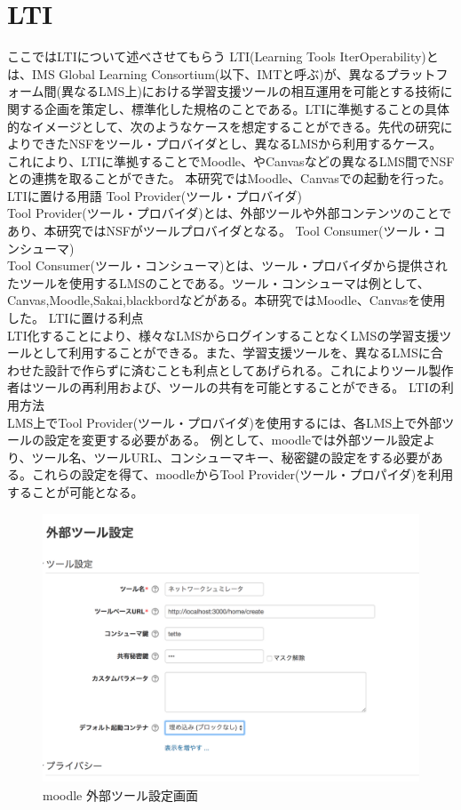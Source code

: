 \section{LTI}
\label{tag:LTI}
ここではLTIについて述べさせてもらう
LTI(Learning Tools IterOperability)とは、IMS Global Learning Consortium(以下、IMTと呼ぶ)が、異なるプラットフォーム間(異なるLMS上)における学習支援ツールの相互運用を可能とする技術に関する企画を策定し、標準化した規格のことである。LTIに準拠することの具体的なイメージとして、次のようなケースを想定することができる。先代の研究によりできたNSFをツール・プロバイダとし、異なるLMSから利用するケース。
これにより、LTIに準拠することでMoodle、やCanvasなどの異なるLMS間でNSFとの連携を取ることができた。
本研究ではMoodle、Canvasでの起動を行った。
LTIに置ける用語
Tool Provider(ツール・プロバイダ)\\
Tool Provider(ツール・プロバイダ)とは、外部ツールや外部コンテンツのことであり、本研究ではNSFがツールプロバイダとなる。
Tool Consumer(ツール・コンシューマ)\\
Tool Consumer(ツール・コンシューマ)とは、ツール・プロバイダから提供されたツールを使用するLMSのことである。ツール・コンシューマは例として、Canvas,Moodle,Sakai,blackbordなどがある。本研究ではMoodle、Canvasを使用した。
LTIに置ける利点\\
LTI化することにより、様々なLMSからログインすることなくLMSの学習支援ツールとして利用することができる。また、学習支援ツールを、異なるLMSに合わせた設計で作らずに済むことも利点としてあげられる。これによりツール製作者はツールの再利用および、ツールの共有を可能とすることができる。
LTIの利用方法\\
LMS上でTool Provider(ツール・プロバイダ)を使用するには、各LMS上で外部ツールの設定を変更する必要がある。
例として、moodleでは外部ツール設定より、ツール名、ツールURL、コンシューマキー、秘密鍵の設定をする必要がある。これらの設定を得て、moodleからTool Provider(ツール・プロパイダ)を利用することが可能となる。
\begin{figure}[htbp]
  \begin{center}
    \includegraphics[clip,width=12.0cm,height=8.0cm]{img/moodleSet.png}
    \caption{moodle 外部ツール設定画面}
    \label{fig:moodle config}
  \end{center}
\end{figure}

